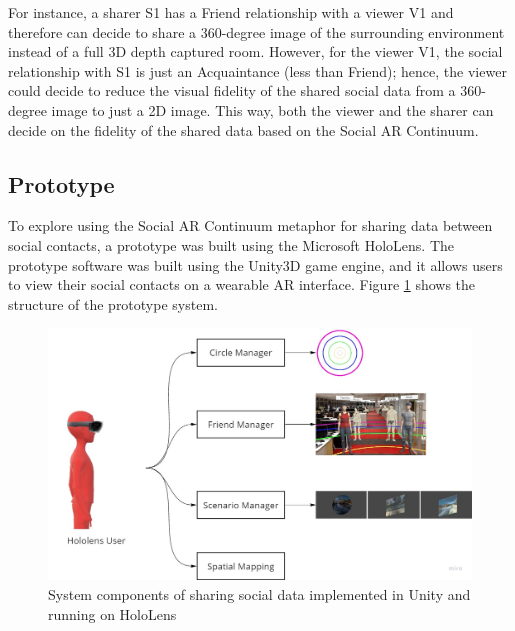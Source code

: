 
For instance, a sharer S1 has a Friend relationship with a viewer V1 and therefore can decide to share a 360-degree image of the surrounding environment instead of a full 3D depth captured room. However, for the viewer V1, the social relationship with S1 is just an Acquaintance (less than Friend); hence, the viewer could decide to reduce the visual fidelity of the shared social data from a 360-degree image to just a 2D image. This way, both the viewer and the sharer can decide on the fidelity of the shared data based on the Social AR Continuum.  


\subsection{Prototype}

To explore using the Social AR Continuum metaphor for sharing data between social contacts, a prototype was built using the Microsoft HoloLens. The prototype software was built using the Unity3D game engine, and it allows users to view their social contacts on a wearable AR interface. Figure \ref{fig:data:system} shows the structure of the prototype system. 

\begin{figure}[ht]
    \centering
    \includegraphics[width=\linewidth]{images/52-data-chi/chi18-system.jpg}
    \caption{System components of sharing social data implemented in Unity and running on HoloLens}
    \label{fig:data:system}
\end{figure}

